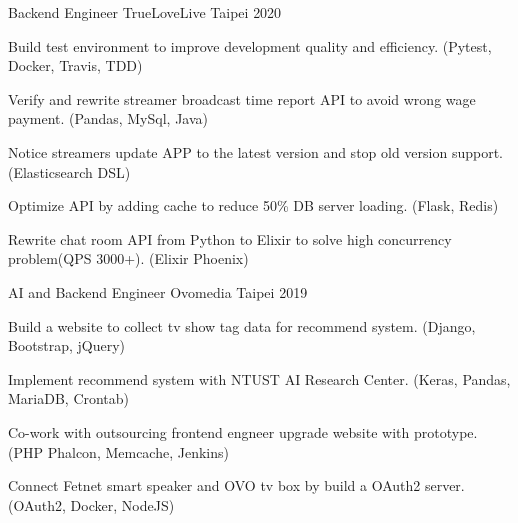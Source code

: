 

\begin{cventries}

  \cventry
    {Backend Engineer} %
    {TrueLoveLive} %
    {Taipei} %
    {2020} %
    {
      \begin{cvitems} %
        \item {Build test environment to improve development quality and efficiency. (Pytest, Docker, Travis, TDD)}
        \item {Verify and rewrite streamer broadcast time report API to avoid wrong wage payment. (Pandas, MySql, Java)}
        \item {Notice streamers update APP to the latest version and stop old version support. (Elasticsearch DSL)}
        \item {Optimize API by adding cache to reduce 50\% DB server loading. (Flask, Redis)}
        \item {Rewrite chat room API from Python to Elixir to solve high concurrency problem(QPS 3000+). (Elixir Phoenix)}
      \end{cvitems}
    }

  \cventry
    {AI and Backend Engineer} %
    {Ovomedia} %
    {Taipei} %
    {2019} %
    {
      \begin{cvitems} %
        \item {Build a website to collect tv show tag data for recommend system. (Django, Bootstrap, jQuery)}
        \item {Implement recommend system with NTUST AI Research Center. (Keras, Pandas, MariaDB, Crontab)}
        \item {Co-work with outsourcing frontend engneer upgrade website with prototype. (PHP Phalcon, Memcache, Jenkins)}
        \item {Connect Fetnet smart speaker and OVO tv box by build a OAuth2 server. (OAuth2, Docker, NodeJS)}
      \end{cvitems}
    }

\end{cventries}
